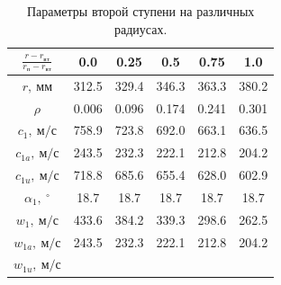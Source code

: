 \documentclass[a4paper,12pt]{article}
\begin{document}
\begin{longtable}{
    |
%    
    c|
%    
    c|
%    
    c|
%    
    c|
%    
    c|
%    
    c|
%    
    }
    \end{longtable}

%        
%    
    \begin{longtable}{
    |
%    
    c|
%    
    c|
%    
    c|
%    
    c|
%    
    c|
%    
    c|
%    
    }
        \caption{Параметры второй ступени на различных радиусах.}\\
        \hline

%        
        $\frac{r - r_{вт}}{r_{п} - r_{вт}}$
%        
        & 0.0
%        
        & 0.25
%        
        & 0.5
%        
        & 0.75
%        
        & 1.0
%        
        \\
        \hline
%        
        $r,\ мм$
%        
        & 312.5
%        
        & 329.4
%        
        & 346.3
%        
        & 363.3
%        
        & 380.2
%        
        \\
        \hline
%        
        $\rho$
%        
        & 0.006
%        
        & 0.096
%        
        & 0.174
%        
        & 0.241
%        
        & 0.301
%        
        \\
        \hline
%        
        $c_1,\ м/с$
%        
        & 758.9
%        
        & 723.8
%        
        & 692.0
%        
        & 663.1
%        
        & 636.5
%        
        \\
        \hline
%        
        $c_{1a},\ м/с$
%        
        & 243.5
%        
        & 232.3
%        
        & 222.1
%        
        & 212.8
%        
        & 204.2
%        
        \\
        \hline
%        
        $c_{1u},\ м/с$
%        
        & 718.8
%        
        & 685.6
%        
        & 655.4
%        
        & 628.0
%        
        & 602.9
%        
        \\
        \hline
%        
        $\alpha_1,\ ^\circ$
%        
        & 18.7
%        
        & 18.7
%        
        & 18.7
%        
        & 18.7
%        
        & 18.7
%        
        \\
        \hline
%        
        $w_1,\ м/с$
%        
        & 433.6
%        
        & 384.2
%        
        & 339.3
%        
        & 298.6
%        
        & 262.5
%        
        \\
        \hline
%        
        $w_{1a},\ м/с$
%        
        & 243.5
%        
        & 232.3
%        
        & 222.1
%        
        & 212.8
%        
        & 204.2
%        
        \\
        \hline
%        
        $w_{1u},\ м/с$

\end{longtable}
\end{document}
